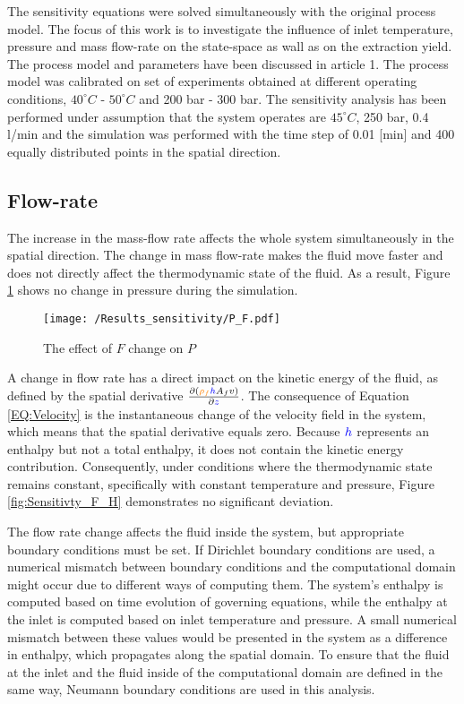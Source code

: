 \documentclass[../Article_Model_Parameters.tex]{subfiles}
\begin{document}
	
	\label{CH: Results}
	
	The sensitivity equations were solved simultaneously with the original process model. The focus of this work is to investigate the influence of inlet temperature, pressure and mass flow-rate on the state-space as wall as on the extraction yield. The process model and parameters have been discussed in {\color{red}article 1}. The process model was calibrated on set of experiments obtained at different operating conditions, $40^\circ C$ - $50^\circ C$ and 200 bar - 300 bar. The sensitivity analysis has been performed under assumption that the system operates are $45^\circ C$, 250 bar, 0.4 l/min and the simulation was performed with the time step of 0.01 [min] and 400 equally distributed points in the spatial direction.
	
	\subsection{Flow-rate}
	
	The increase in the mass-flow rate affects the whole system simultaneously in the spatial direction. The change in mass flow-rate makes the fluid move faster and does not directly affect the thermodynamic state of the fluid. As a result, Figure \ref{fig:Sensitivty_F_P} shows no change in pressure during the simulation. 
    
    \begin{figure}[h!]
    	\centering
    	\texttt{[image: /Results\_sensitivity/P\_F.pdf]}
    	\caption{The effect of $F$ change on $P$}
    	\label{fig:Sensitivty_F_P}
    \end{figure}
    
    A change in flow rate has a direct impact on the kinetic energy of the fluid, as defined by the spatial derivative $\frac{\partial \left( {\color{orange}\rho_f}{\color{blue}h} A_f v \right)}{\partial {\color{blue}z}}$. The consequence of Equation \ref{EQ:Velocity} is the instantaneous change of the velocity field in the system, which means that the spatial derivative equals zero. Because ${\color{blue}h}$ represents an enthalpy but not a total enthalpy, it does not contain the kinetic energy contribution. Consequently, under conditions where the thermodynamic state remains constant, specifically with constant temperature and pressure, Figure \ref{fig:Sensitivty_F_H} demonstrates no significant deviation.
    
    The flow rate change affects the fluid inside the system, but appropriate boundary conditions must be set. If Dirichlet boundary conditions are used, a numerical mismatch between boundary conditions and the computational domain might occur due to different ways of computing them. The system's enthalpy is computed based on time evolution of governing equations, while the enthalpy at the inlet is computed based on inlet temperature and pressure. A small numerical mismatch between these values would be presented in the system as a difference in enthalpy, which propagates along the spatial domain. To ensure that the fluid at the inlet and the fluid inside of the computational domain are defined in the same way, Neumann boundary conditions are used in this analysis.
        
\end{document}
